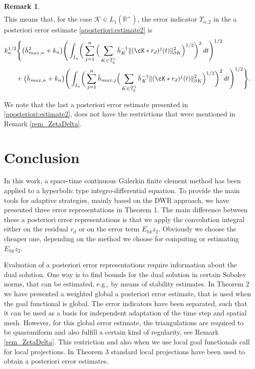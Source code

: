 \documentclass{amsart}
\numberwithin{equation}{section}
\theoremstyle{definition}
\newtheorem{remark}{Remark}
\begin{document}
\begin{remark}
\begin{equation*}
\begin{split}
  \end{split}
\end{equation*}
This means that, for the case ${\mathcal K} \in L_1(\mathbb{R}^+)$, 
the error indicator $\Upsilon_{n,2}$ in the a posteriori error estimate \eqref{aposteriori:estimate2} is
\begin{equation*}   
  \begin{split}
    & k_n^{1/2}
    \Bigg\{
    \big(\bar h_{max,n}^2+k_n\big)\Bigg(\int_{I_n}\!\bigg(
    \sum_{j=1}^n
    \Big(\sum_{K\in\bar{\mathcal T}_h^j}\bar h_K^{-1}
    \|(\cK*r_d)^j(t)\|_{\partial K}^2
    \Big)^{1/2}\bigg)^2\,dt\Bigg)^{1/2}\\
    &\quad\ \ 
    +\big(\bar h_{max,n}+k_n\big)\Bigg(\int_{I_n}\!\bigg(
    \sum_{j=1}^n \bar h_{max,j}
    \Big(\sum_{K\in\bar{\mathcal T}_h^j}\bar h_K^{-1}
    \|(\cK*r_d)^j(t)\|_{\partial K}^2
    \Big)^{1/2}\bigg)^2\,dt\Bigg)^{1/2} \Bigg\}.
  \end{split}
\end{equation*}
\end{remark}

We note that the last a posteriori error estimate presented in
\eqref{aposteriori:estimate2}, does not have the restrictions
that were mentioned in Remark \ref{rem_ZetaDelta}.

\section{{\bf Conclusion}}
In this work, a space-time continuous Galerkin finite element method has been 
applied to a hyperbolic type integro-differential equation. 
To provide the main tools for adaptive strategies, mainly based on the DWR 
approach, we have presented three error representations in Theorem 1.  
The main difference between these a posteriori error representations 
is that  we apply the convolution integral 
either on the residual $r_d$ or on the error term $E_{hk}z_2$.  
Obviously we choose the cheaper one, depending on the method 
we choose for computing or estimating $E_{hk}z_2$. 

Evaluation of a posteriori error representations require information about 
the dual solution. One way is to find bounds for the dual solution in certain 
Sobolev norms, that can be estimated, e.g., by means of stability estimates.  
In Theorem 2 we have presented a weighted global a posteriori error 
estimate, that is used when the goal functional is global. The error indicators 
have been separated, such that it can be used as a basis for independent 
adaptation of the time  step and spatial mesh. 
However, for this global error estimate, the  triangulations 
are required to be quasiuniform and also fulfill a certain kind of regularity, 
see Remark \ref{rem_ZetaDelta}. 
This restriction and also when we use local goal functionals call for 
local projections. In Theorem 3 standard local projections have been used 
to obtain a posteriori error estimates. 
\end{document}
